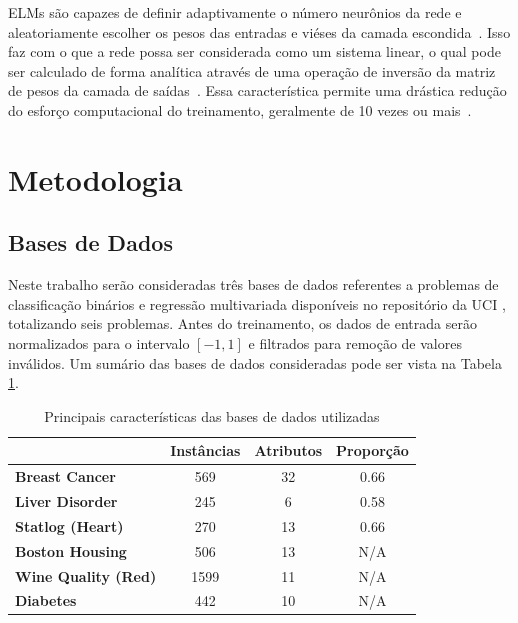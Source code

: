 \documentclass[conference]{IEEEtran}
\begin{document}
	ELMs são capazes de definir adaptivamente o número neurônios da rede e aleatoriamente escolher os pesos das entradas e viéses da camada escondida~\cite{huang2006extreme}. Isso faz com o que a rede possa ser considerada como um sistema linear, o qual pode ser calculado de forma analítica através de uma operação de inversão da matriz de pesos da camada de saídas~\cite{huang2006extreme}. Essa característica permite uma drástica redução do esforço computacional do treinamento, geralmente de 10 vezes ou mais~\cite{deng2010research}. 
	
	\section{Metodologia}
	\subsection{Bases de Dados}
	Neste trabalho serão consideradas três bases de dados referentes a problemas de classificação binários e regressão multivariada disponíveis no repositório da UCI \cite{dua2019}, totalizando seis problemas. Antes do treinamento, os dados de entrada serão normalizados para o intervalo $[-1,1]$ e filtrados para remoção de valores inválidos. Um sumário das bases de dados consideradas pode ser vista na Tabela \ref{tab:datasets}.
	
	\begin{table}[thpbh]
		\caption{Principais características das bases de dados utilizadas}
		\label{tab:datasets}
		\centering
		\begin{tabular}{l|c|c|c|}
			\cline{2-4}
			& \textbf{Instâncias} & \textbf{Atributos} & \textbf{Proporção} \\ \hline
			\multicolumn{1}{|l|}{\textbf{Breast Cancer}}   & 569                 & 32                 & 0.66                           \\ \hline
			\multicolumn{1}{|l|}{\textbf{Liver Disorder}}  & 245                 & 6                  & 0.58                           \\ \hline
			\multicolumn{1}{|l|}{\textbf{Statlog (Heart)}} & 270                 & 13                 & 0.66                           \\ \hline
			\multicolumn{1}{|l|}{\textbf{Boston Housing}}  & 506                 & 13                 & N/A                            \\ \hline
			\multicolumn{1}{|l|}{\textbf{Wine Quality (Red)}}      & 1599                 & 11                 & N/A                            \\ \hline
			\multicolumn{1}{|l|}{\textbf{Diabetes}}        & 442                 & 10                 & N/A                            \\ \hline
		\end{tabular}
	\end{table}
	
\end{document}
